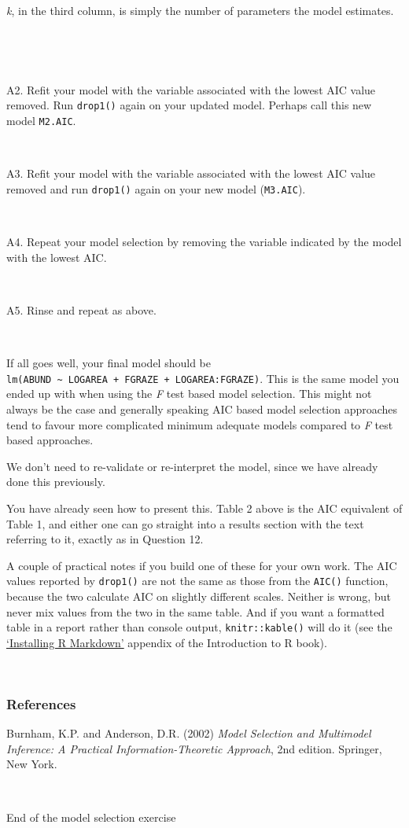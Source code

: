 \documentclass[
]{article}
\begin{document}
\emph{k}, in the third column, is simply the number of parameters the
model estimates.

~

~

A2. Refit your model with the variable associated with the lowest AIC
value removed. Run \texttt{drop1()} again on your updated model. Perhaps
call this new model \texttt{M2.AIC}.

~

A3. Refit your model with the variable associated with the lowest AIC
value removed and run \texttt{drop1()} again on your new model
(\texttt{M3.AIC}).

~

A4. Repeat your model selection by removing the variable indicated by
the model with the lowest AIC.

~

A5. Rinse and repeat as above.

~

If all goes well, your final model should be
\texttt{lm(ABUND\ \textasciitilde{}\ LOGAREA\ +\ FGRAZE\ +\ LOGAREA:FGRAZE)}.
This is the same model you ended up with when using the \emph{F} test
based model selection. This might not always be the case and generally
speaking AIC based model selection approaches tend to favour more
complicated minimum adequate models compared to \emph{F} test based
approaches.

We don't need to re-validate or re-interpret the model, since we have
already done this previously.

You have already seen how to present this. Table 2 above is the AIC
equivalent of Table 1, and either one can go straight into a results
section with the text referring to it, exactly as in Question 12.

A couple of practical notes if you build one of these for your own work.
The AIC values reported by \texttt{drop1()} are not the same as those
from the \texttt{AIC()} function, because the two calculate AIC on
slightly different scales. Neither is wrong, but never mix values from
the two in the same table. And if you want a formatted table in a report
rather than console output, \texttt{knitr::kable()} will do it (see the
\href{https://intro2r.com/install-rm.html}{`Installing R Markdown'}
appendix of the Introduction to R book).

~

\subsubsection{References}\label{refs}

Burnham, K.P. and Anderson, D.R. (2002) \emph{Model Selection and
Multimodel Inference: A Practical Information-Theoretic Approach}, 2nd
edition. Springer, New York.

~

End of the model selection exercise
\end{document}
